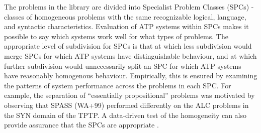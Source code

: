\documentclass[runningheads]{llncs}
\begin{document}
The problems in the library are divided into Specialist Problem Classes (SPCs) - classes of 
homogeneous problems with the same recognizable logical, language, and syntactic characteristics.
Evaluation of ATP systems within SPCs makes it possible to say which systems work well for what 
types of problems. 
The appropriate level of subdivision for SPCs is that at which less subdivision would merge 
SPCs for which ATP systems have distinguishable behaviour, and at which further subdivision
would unnecessarily split an SPC for which ATP systems have reasonably homogenous behaviour.
Empirically, this is ensured by examining the patterns of system performance across the 
problems in each SPC. 
For example, the separation of ``essentially propositional'' problems was motivated by 
observing that SPASS (WA+99) performed differently on the ALC problems in the SYN domain of the 
TPTP.
A data-driven test of the homogeneity can also provide assurance that the SPCs are
appropriate \cite{FS02}.
\end{document}
